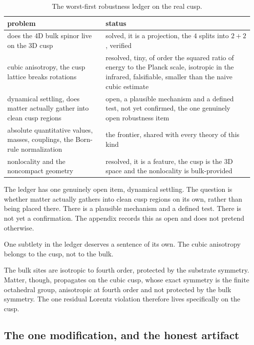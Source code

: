 \begin{table}[ht]
\centering
\begin{tabular}{@{}p{}p{}@{}}
\toprule
problem & status \\
\midrule
does the $4$D bulk spinor live on the $3$D cusp & solved, it is a projection, the $4$ splits into $2 + 2$, verified \\
cubic anisotropy, the cusp lattice breaks rotations & resolved, tiny, of order the squared ratio of energy to the Planck scale, isotropic in the infrared, falsifiable, smaller than the naive cubic estimate \\
dynamical settling, does matter actually gather into clean cusp regions & open, a plausible mechanism and a defined test, not yet confirmed, the one genuinely open robustness item \\
absolute quantitative values, masses, couplings, the Born-rule normalization & the frontier, shared with every theory of this kind \\
nonlocality and the noncompact geometry & resolved, it is a feature, the cusp is the $3$D space and the nonlocality is bulk-provided \\
\bottomrule
\end{tabular}
\caption{The worst-first robustness ledger on the real cusp.}
\label{tab:ledger}
\end{table}

The ledger has one genuinely open item, dynamical settling. The question is whether matter actually gathers into clean cusp regions on its own, rather than being placed there. There is a plausible mechanism and a defined test. There is not yet a confirmation. The appendix records this as open and does not pretend otherwise.

One subtlety in the ledger deserves a sentence of its own. The cubic anisotropy belongs to the cusp, not to the bulk.

\begin{proposition}
The bulk sites are isotropic to fourth order, protected by the substrate symmetry. Matter, though, propagates on the cubic cusp, whose exact symmetry is the finite octahedral group, anisotropic at fourth order and not protected by the bulk symmetry. The one residual Lorentz violation therefore lives specifically on the cusp.
\end{proposition}

\subsection{The one modification, and the honest artifact}

